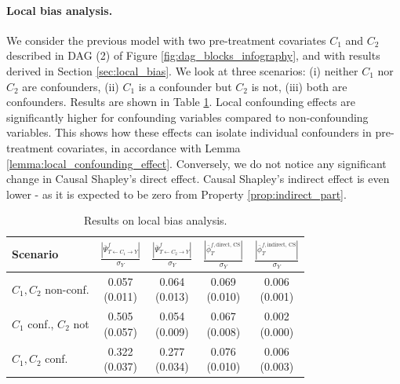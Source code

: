 \documentclass{article}
\theoremstyle{plain}
\theoremstyle{definition}
\theoremstyle{remark}
\newcommand{\effect}{\Psi}
\theoremstyle{mystyle}
\begin{document}
\paragraph{Local bias analysis.} We consider the previous model with two pre-treatment covariates $C_1$ and $C_2$ described in DAG (2) of Figure \ref{fig:dag_blocks_infography}, and with results derived in Section \ref{sec:local_bias}.  We look at three scenarios: (i) neither $C_1$ nor $C_2$ are confounders, (ii) $C_1$ is a confounder but $C_2$ is not, (iii) both are confounders. Results are shown in Table \ref{tab:synthetic_xp_localbias_twovars}. Local confounding effects are significantly higher for confounding variables compared to non-confounding variables. This shows how these effects can isolate individual confounders in pre-treatment covariates, in accordance with Lemma \ref{lemma:local_confounding_effect}. Conversely, we do not notice any significant change in Causal Shapley's direct effect. Causal Shapley's indirect effect is even lower - as it is expected to be zero from Property \ref{prop:indirect_part}.
    
   
\begin{table}
\centering
\setlength{\tabcolsep}{2pt}
  \caption{Results on local bias analysis. %
  }%
\label{tab:synthetic_xp_localbias_twovars}


\begin{tabular}{l|cccc}
Scenario &  $\frac{|\bar{\effect}^f_{T \leftarrow C_1 \rightarrow Y}|}{\sigma_Y}$ &  $\frac{|\bar{\effect}^f_{T \leftarrow C_2 \rightarrow Y}|}{\sigma_Y}$ & $\frac{|\bar{\phi}^{f,\text{direct, CS}}_T|}{\sigma_Y}$ & $\frac{|\bar{\phi}^{f,\text{indirect, CS}}_T|}{\sigma_Y}$ \\ 
\toprule
 \makecell[l]{$C_1, C_2$ \\ non-conf.}  & \makecell{0.057 \\ (0.011)} & \makecell{0.064 \\ (0.013)} & \makecell{0.069 \\ (0.010)} & \makecell{0.006 \\ (0.001)} \\ 
 \midrule
 \makecell[l]{$C_1$ conf.,\\$C_2$ not} & \makecell{0.505 \\ (0.057)}  & \makecell{0.054 \\ (0.009)} & \makecell{0.067 \\ (0.008)} & \makecell{0.002 \\ (0.000)} \\ 
 \midrule
 \makecell[l]{$C_1, C_2$ \\ conf.} & \makecell{0.322 \\ (0.037)} & \makecell{0.277 \\ (0.034)} & \makecell{0.076 \\ (0.010)} & \makecell{0.006 \\ (0.003)}
\end{tabular}
\end{table}
\end{document}
